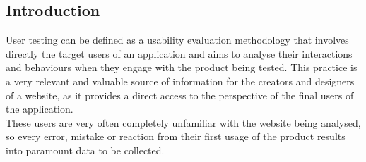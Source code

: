 
\subsection{Introduction}
\label{subsec:introUT}

User testing can be defined as a usability evaluation methodology that involves directly the target users of an application and aims to analyse their interactions and behaviours when they engage with the product being tested.
This practice is a very relevant and valuable source of information for the creators and designers of a website, as it provides a direct access to the perspective of the final users of the application.\\
These users are very often completely unfamiliar with the website being analysed, so every error, mistake or reaction from their first usage of the product results into paramount data to be collected.

